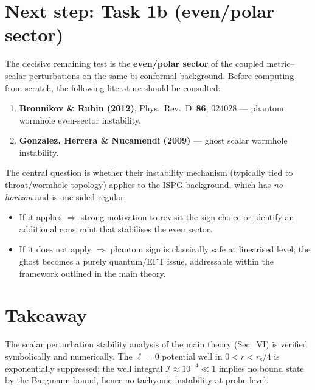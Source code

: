 \documentclass[11pt]{article}
\newcommand{\rs}{r_{\mathrm{s}}}
\begin{document}
\section{Next step: Task 1b (even/polar sector)}

The decisive remaining test is the \textbf{even/polar sector} of the
coupled metric--scalar perturbations on the same bi-conformal background.
Before computing from scratch, the following literature should be consulted:

\begin{enumerate}
\item \textbf{Bronnikov \& Rubin (2012)},
Phys.\ Rev.\ D~\textbf{86}, 024028 ---
phantom wormhole even-sector instability.
\item \textbf{Gonzalez, Herrera \& Nucamendi (2009)} ---
ghost scalar wormhole instability.
\end{enumerate}

The central question is whether their instability mechanism
(typically tied to throat/wormhole topology) applies to the ISPG
background, which has \emph{no horizon} and is one-sided regular:

\begin{itemize}
\item If it applies $\Rightarrow$ strong motivation to revisit the
sign choice or identify an additional constraint that stabilises the
even sector.
\item If it does not apply $\Rightarrow$ phantom sign is
classically safe at linearised level; the ghost becomes a
purely quantum/EFT issue, addressable within the framework
outlined in the main theory.
\end{itemize}

\section*{Takeaway}
The scalar perturbation stability analysis of the main theory (Sec.~VI) is verified symbolically and numerically. The $\ell=0$ potential well in $0<r<\rs/4$ is exponentially suppressed; the well integral $\mathcal{I}\approx 10^{-4}\ll 1$ implies no bound state by the Bargmann bound, hence no tachyonic instability at probe level.
\end{document}

